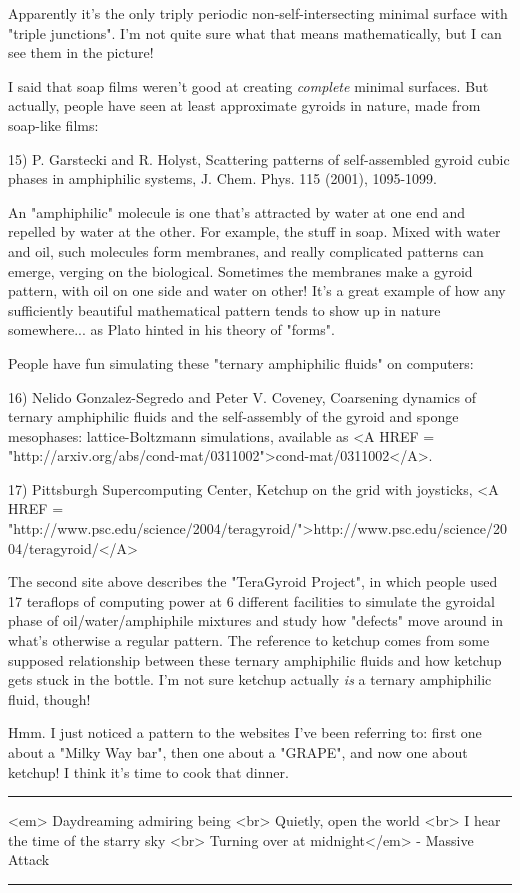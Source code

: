 Apparently it's the only triply periodic non-self-intersecting 
minimal surface with "triple junctions".  I'm not quite 
sure what that means mathematically, but I can see them in the picture!

I said that soap films weren't good at creating \emph{complete} minimal
surfaces.  But actually, people have seen at least approximate gyroids
in nature, made from soap-like films:

15) P. Garstecki and R. Holyst, Scattering patterns of self-assembled 
gyroid cubic phases in amphiphilic systems, J. Chem. Phys. 115 (2001),
1095-1099.

An "amphiphilic" molecule is one that's attracted by water at one 
end and repelled by water at the other.  For example, the stuff in soap.
Mixed with water and oil, such 
molecules form membranes, and really complicated patterns can emerge,
verging on the biological.  Sometimes the membranes make a gyroid
pattern, with oil on one side and water on other!  It's a great example
of how any sufficiently beautiful mathematical pattern tends to show up
in nature somewhere... as Plato hinted in his theory of "forms".

People have fun simulating these "ternary amphiphilic fluids" 
on computers:

16) Nelido Gonzalez-Segredo and Peter V. Coveney, Coarsening dynamics of 
ternary amphiphilic fluids and the self-assembly of the gyroid and 
sponge mesophases: lattice-Boltzmann simulations, available as 
<A HREF = "http://arxiv.org/abs/cond-mat/0311002">cond-mat/0311002</A>.

17) Pittsburgh Supercomputing Center, Ketchup on the grid with joysticks,
<A HREF = "http://www.psc.edu/science/2004/teragyroid/">http://www.psc.edu/science/2004/teragyroid/</A>

The second site above describes the "TeraGyroid Project", in which
people used 17 teraflops of computing power at 6 different facilities 
to simulate the gyroidal phase of oil/water/amphiphile mixtures and 
study how "defects" move around in what's otherwise a regular 
pattern.  
The reference to ketchup comes from some supposed relationship between 
these ternary amphiphilic fluids and how ketchup gets stuck in
the bottle.  I'm not sure ketchup actually \emph{is} a ternary amphiphilic
fluid, though!

Hmm.  I just noticed a pattern to the websites I've been referring
to: first one about a "Milky Way bar", then one about 
a "GRAPE", and
now one about ketchup!  I think it's time to cook that dinner.



\par\noindent\rule{\textwidth}{0.4pt}
<em>
Daydreaming admiring being <br>
Quietly, open the world <br>
I hear the time of the starry sky <br>
Turning over at midnight</em> - Massive Attack

\par\noindent\rule{\textwidth}{0.4pt}

